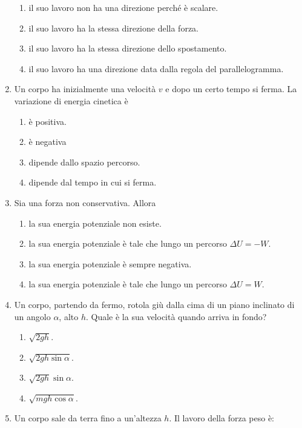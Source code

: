 \documentclass{article}
\begin{document}
\begin{enumerate}
  \begin{enumerate}[label=\Alph*.]
    \item il suo lavoro non ha una direzione perché è scalare.
    \item il suo lavoro ha la stessa direzione della forza.
    \item il suo lavoro ha la stessa direzione dello spostamento.
    \item il suo lavoro ha una direzione data dalla regola del parallelogramma.
  \end{enumerate}
  \item Un corpo ha inizialmente una velocità $v$ e dopo un certo tempo si ferma. La variazione di energia cinetica è
  \begin{enumerate}[label=\Alph*.]
    \item è positiva.
    \item è negativa
    \item dipende dallo spazio percorso.
    \item dipende dal tempo in cui si ferma.
  \end{enumerate}
  \item Sia  una forza non conservativa. Allora
  \begin{enumerate}[label=\Alph*.]
    \item la sua energia potenziale non esiste.
    \item la sua energia potenziale è tale che lungo un percorso $\Delta U=-W$.
    \item la sua energia potenziale è sempre negativa.
    \item la sua energia potenziale è tale che lungo un percorso $\Delta U=W$.
  \end{enumerate}
  \item Un corpo, partendo da fermo, rotola giù dalla cima di un piano inclinato di un angolo $\alpha$, alto $h$. Quale è la sua velocità quando arriva in fondo?
  \begin{enumerate}[label=\Alph*.]
    \item $\sqrt{2gh}$.
    \item $\sqrt{2gh\sin\alpha}$.
    \item $\sqrt{2gh}\sin\alpha$.
    \item $\sqrt{mgh\cos\alpha}$.
  \end{enumerate}
  \item Un corpo sale da terra fino a un'altezza $h$. Il lavoro della forza peso è:
  \begin{enumerate}[label=\Alph*.]

\end{enumerate}
\end{enumerate}
\end{document}
